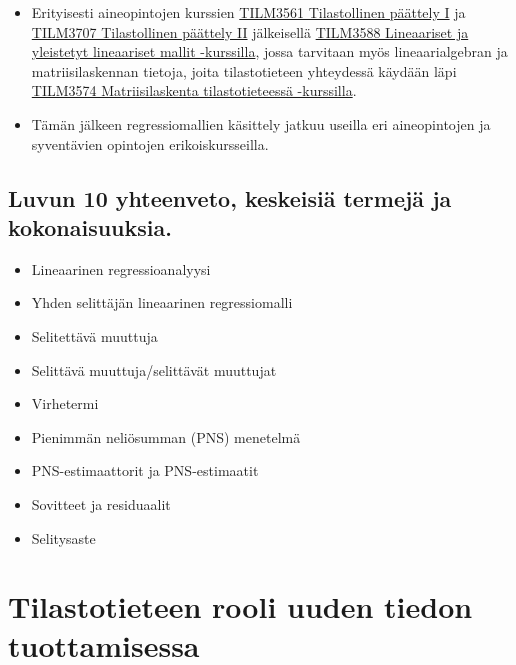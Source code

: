 \documentclass[
]{book}
\providecommand{\tightlist}{%
  \setlength{\itemsep}{0pt}\setlength{\parskip}{0pt}}
\begin{document}
\begin{itemize}
  \begin{itemize}
  \tightlist
  \item
    Erityisesti aineopintojen kurssien \href{https://opas.peppi.utu.fi/fi/opintojakso/TILM3561/5069?period=2024-2027}{TILM3561 Tilastollinen päättely I} ja \href{https://opas.peppi.utu.fi/fi/opintojakso/TILM3707/100872?period=2024-2027}{TILM3707 Tilastollinen päättely II} jälkeisellä \href{https://opas.peppi.utu.fi/fi/opintojakso/TILM3588/5071?period=2024-2027}{TILM3588 Lineaariset ja yleistetyt lineaariset mallit -kurssilla}, jossa tarvitaan myös lineaarialgebran ja matriisilaskennan tietoja, joita tilastotieteen yhteydessä käydään läpi \href{https://opas.peppi.utu.fi/fi/opintojakso/TILM3574/5082?period=2024-2027}{TILM3574 Matriisilaskenta tilastotieteessä -kurssilla}.
  \item
    Tämän jälkeen regressiomallien käsittely jatkuu useilla eri aineopintojen ja syventävien opintojen erikoiskursseilla.
  \end{itemize}
\end{itemize}

\hypertarget{luvun-10-yhteenveto-keskeisiuxe4-termejuxe4-ja-kokonaisuuksia.}{%
\section{Luvun 10 yhteenveto, keskeisiä termejä ja kokonaisuuksia.}\label{luvun-10-yhteenveto-keskeisiuxe4-termejuxe4-ja-kokonaisuuksia.}}

\begin{itemize}
\tightlist
\item
  Lineaarinen regressioanalyysi
\item
  Yhden selittäjän lineaarinen regressiomalli
\item
  Selitettävä muuttuja
\item
  Selittävä muuttuja/selittävät muuttujat
\item
  Virhetermi
\item
  Pienimmän neliösumman (PNS) menetelmä
\item
  PNS-estimaattorit ja PNS-estimaatit
\item
  Sovitteet ja residuaalit
\item
  Selitysaste
\end{itemize}


\hypertarget{luku11}{%
\chapter{Tilastotieteen rooli uuden tiedon tuottamisessa}\label{luku11}}
\end{document}
